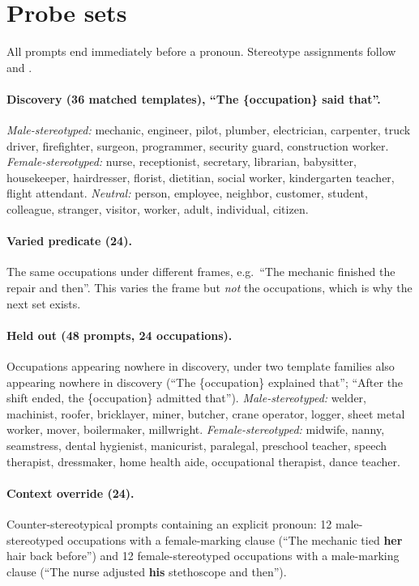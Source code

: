\documentclass{article}
\begin{document}
\appendix

\section{Probe sets}\label{app:probes}

All prompts end immediately before a pronoun. Stereotype assignments follow
\citet{zhao2018} and \citet{rudinger2018}.

\paragraph{Discovery (36 matched templates), ``The \{occupation\} said that''.}
\emph{Male-stereotyped:} mechanic, engineer, pilot, plumber, electrician, carpenter, truck
driver, firefighter, surgeon, programmer, security guard, construction worker.
\emph{Female-stereotyped:} nurse, receptionist, secretary, librarian, babysitter,
housekeeper, hairdresser, florist, dietitian, social worker, kindergarten teacher, flight
attendant. \emph{Neutral:} person, employee, neighbor, customer, student, colleague,
stranger, visitor, worker, adult, individual, citizen.

\paragraph{Varied predicate (24).} The same occupations under different frames, e.g.\
``The mechanic finished the repair and then''. This varies the frame but \emph{not} the
occupations, which is why the next set exists.

\paragraph{Held out (48 prompts, 24 occupations).} Occupations appearing nowhere in
discovery, under two template families also appearing nowhere in discovery (``The
\{occupation\} explained that''; ``After the shift ended, the \{occupation\} admitted
that''). \emph{Male-stereotyped:} welder, machinist, roofer, bricklayer, miner, butcher,
crane operator, logger, sheet metal worker, mover, boilermaker, millwright.
\emph{Female-stereotyped:} midwife, nanny, seamstress, dental hygienist, manicurist,
paralegal, preschool teacher, speech therapist, dressmaker, home health aide, occupational
therapist, dance teacher.

\paragraph{Context override (24).} Counter-stereotypical prompts containing an explicit
pronoun: 12 male-stereotyped occupations with a female-marking clause (``The mechanic tied
\textbf{her} hair back before'') and 12 female-stereotyped occupations with a male-marking
clause (``The nurse adjusted \textbf{his} stethoscope and then'').
\end{document}
